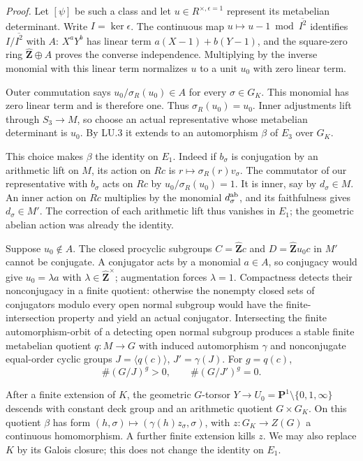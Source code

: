 \emph{Proof.}
Let $[\psi]$ be such a class and let $u\in R^{\times,\epsilon=1}$
represent its metabelian determinant. Write $I=\ker\epsilon$.
The continuous map $u\mapsto u-1\bmod\overline{I^2}$ identifies
$I/\overline{I^2}$ with $A$: $X^aY^b$ has linear term
$a(X-1)+b(Y-1)$, and the square-zero ring
$\widehat{\mathbf Z}\oplus A$ proves the converse independence.
Multiplying by the inverse monomial with this linear term
normalizes $u$ to a unit $u_0$ with zero linear term.

Outer commutation says $u_0/\sigma_R(u_0)\in A$ for every
$\sigma\in G_K$. This monomial has zero linear term and is
therefore one. Thus $\sigma_R(u_0)=u_0$. Inner adjustments lift
through $S_3\to M$, so choose an actual representative whose
metabelian determinant is $u_0$. By LU.3 it extends to an
automorphism $\beta$ of $E_3$ over $G_K$.

This choice makes $\beta$ the identity on $E_1$. Indeed if
$b_\sigma$ is conjugation by an arithmetic lift on $M$, its
action on $Rc$ is $r\mapsto\sigma_R(r)v_\sigma$. The commutator
of our representative with $b_\sigma$ acts on $Rc$ by
$u_0/\sigma_R(u_0)=1$. It is inner, say by $d_\sigma\in M$.
An inner action on $Rc$ multiplies by the monomial
$d_\sigma^{\rm ab}$, and its faithfulness gives $d_\sigma\in M'$.
The correction of each arithmetic lift thus vanishes in $E_1$;
the geometric abelian action was already the identity.

Suppose $u_0\notin A$. The closed procyclic subgroups
$C=\widehat{\mathbf Z}c$ and $D=\widehat{\mathbf Z}u_0c$ in
$M'$ cannot be conjugate. A conjugator acts by a monomial
$a\in A$, so conjugacy would give $u_0=\lambda a$ with
$\lambda\in\widehat{\mathbf Z}^{\times}$; augmentation forces
$\lambda=1$. Compactness detects their nonconjugacy in a
finite quotient: otherwise the nonempty closed sets of
conjugators modulo every open normal subgroup would have
the finite-intersection property and yield an actual conjugator.
Intersecting the finite automorphism-orbit of a detecting
open normal subgroup produces a stable finite metabelian
quotient $q:M\to G$ with induced automorphism $\gamma$ and
nonconjugate equal-order cyclic groups
$J=\langle q(c)\rangle$, $J'=\gamma(J)$. For $g=q(c)$,
\[
             \#(G/J)^g>0,\qquad \#(G/J')^g=0.
\]

After a finite extension of $K$, the geometric $G$-torsor
$Y\to U_0=\mathbf P^1\setminus\{0,1,\infty\}$ descends with
constant deck group and an arithmetic quotient $G\times G_K$.
On this quotient $\beta$ has form
$(h,\sigma)\mapsto(\gamma(h)z_\sigma,\sigma)$, with
$z:G_K\to Z(G)$ a continuous homomorphism. A further finite
extension kills $z$. We may also replace $K$ by its Galois
closure; this does not change the identity on $E_1$.


